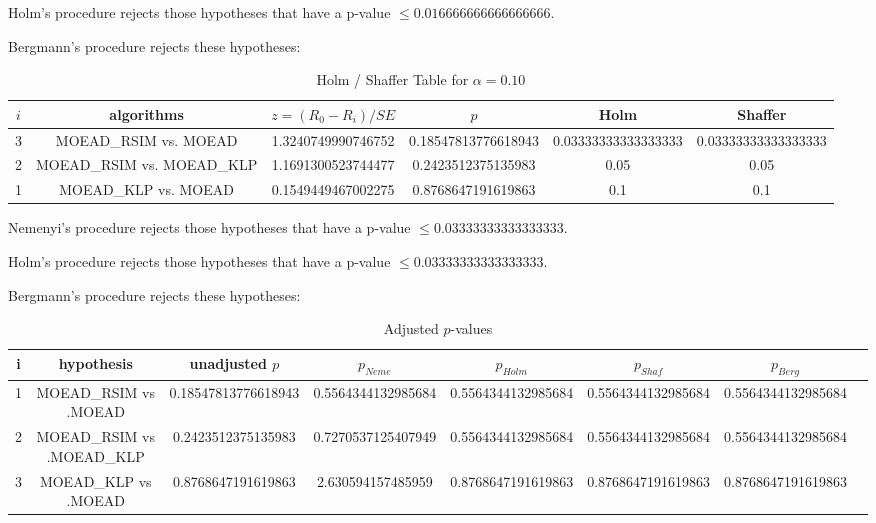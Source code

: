 \documentclass[a4paper,10pt]{article}
\begin{document}
\begin{landscape}
Holm's procedure rejects those hypotheses that have a p-value $\le0.016666666666666666$.


Bergmann's procedure rejects these hypotheses:


\begin{itemize}


\end{itemize}


\begin{table}[!htp]
\centering\tiny
\caption{Holm / Shaffer Table for $\alpha=0.10$}
\begin{tabular}{cccccc}
$i$&algorithms&$z=(R_0 - R_i)/SE$&$p$&Holm&Shaffer\\
\hline
3&MOEAD_RSIM vs. MOEAD&1.3240749990746752&0.18547813776618943&0.03333333333333333&0.03333333333333333\\
2&MOEAD_RSIM vs. MOEAD_KLP&1.1691300523744477&0.2423512375135983&0.05&0.05\\
1&MOEAD_KLP vs. MOEAD&0.1549449467002275&0.8768647191619863&0.1&0.1\\
\hline
\end{tabular}
\end{table}
Nemenyi's procedure rejects those hypotheses that have a p-value $\le0.03333333333333333$.


Holm's procedure rejects those hypotheses that have a p-value $\le0.03333333333333333$.


Bergmann's procedure rejects these hypotheses:


\begin{itemize}


\end{itemize}


\begin{table}[!htp]
\centering\tiny
\caption{Adjusted $p$-values}
\begin{tabular}{cccccccc}
i&hypothesis&unadjusted $p$&$p_{Neme}$&$p_{Holm}$&$p_{Shaf}$&$p_{Berg}$\\
\hline
1&MOEAD_RSIM vs .MOEAD&0.18547813776618943&0.5564344132985684&0.5564344132985684&0.5564344132985684&0.5564344132985684\\
2&MOEAD_RSIM vs .MOEAD_KLP&0.2423512375135983&0.7270537125407949&0.5564344132985684&0.5564344132985684&0.5564344132985684\\
3&MOEAD_KLP vs .MOEAD&0.8768647191619863&2.630594157485959&0.8768647191619863&0.8768647191619863&0.8768647191619863\\
\hline
\end{tabular}
\end{table}

\end{landscape}
\end{document}
